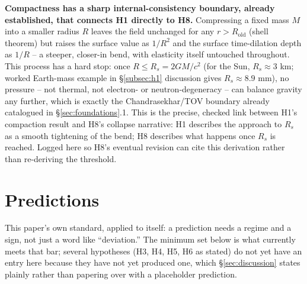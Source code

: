 \documentclass[12pt, a4paper]{article}
\begin{document}
\textbf{Compactness has a sharp internal-consistency boundary, already
established, that connects H1 directly to H8.} Compressing a fixed
mass $M$ into a smaller radius $R$ leaves the field unchanged for any
$r>R_{\mathrm{old}}$ (shell theorem) but raises the surface value as
$1/R^2$ and the surface time-dilation depth as $1/R$ -- a steeper,
closer-in bend, with elasticity itself untouched throughout. This
process has a hard stop: once $R\le R_s=2GM/c^2$ (for the Sun,
$R_s\approx3$ km; worked Earth-mass example in \S\ref{subsec:h1}
discussion gives $R_s\approx8.9$ mm), no pressure -- not thermal, not
electron- or neutron-degeneracy -- can balance gravity any further,
which is exactly the Chandrasekhar/TOV boundary already catalogued in
\S\ref{sec:foundations}.1. This is the precise, checked link between
H1's compaction result and H8's collapse narrative: H1 describes the
approach to $R_s$ as a smooth tightening of the bend; H8 describes
what happens once $R_s$ is reached. Logged here so H8's eventual
revision can cite this derivation rather than re-deriving the
threshold.

\section{Predictions}
\label{sec:predictions}
This paper's own standard, applied to itself: a prediction needs a
regime and a sign, not just a word like ``deviation.'' The minimum
set below is what currently meets that bar; several hypotheses
(H3, H4, H5, H6 as stated) do not yet have an entry here because they
have not yet produced one, which \S\ref{sec:discussion} states
plainly rather than papering over with a placeholder prediction.
\end{document}
